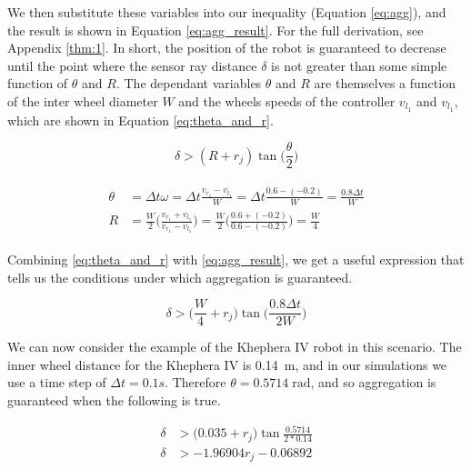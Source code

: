 \documentclass[conference]{IEEEtran}
\begin{document}
  We then substitute these variables into our inequality (Equation \ref{eq:agg}), and the result is shown in Equation \ref{eq:agg_result}. For the full derivation, see Appendix \ref{thm:1}. In short, the position of the robot is guaranteed to decrease until the point where the sensor ray distance $\delta$ is not greater than some simple function of $\theta$ and $R$. The dependant variables $\theta$ and $R$ are themselves a function of the inter wheel diameter $W$ and the wheels speeds of the controller $v_{l_1}$ and $v_{l_1}$, which are shown in Equation \ref{eq:theta_and_r}.

  \begin{equation} \label{eq:agg_result}
    \delta > (R + r_j)\tan\bigg(\frac{\theta}{2}\bigg)
  \end{equation}

  \begin{align}
    \begin{split} \label{eq:theta_and_r}
      \theta &= \Delta t\omega = \Delta t \frac{v_{r_1} - v_{l_1}}{W} = \Delta t \frac{0.6 - (-0.2)}{W} = \frac{0.8\Delta t}{W} \\
      R &= \frac{W}{2}\bigg(\frac{v_{r_1} + v_{l_1}}{v_{r_1} - v_{l_1}}\bigg) = \frac{W}{2}\bigg(\frac{0.6 + (-0.2)}{0.6 - (-0.2)}\bigg) = \frac{W}{4}
    \end{split}
  \end{align}

  Combining \ref{eq:theta_and_r} with \ref{eq:agg_result}, we get a useful expression that tells us the conditions under which aggregation is guaranteed.

  \begin{equation*} \label{eq:agg_final_result}
    \delta > \bigg(\frac{W}{4} + r_j\bigg)\tan\bigg(\frac{0.8\Delta t}{2W}\bigg)
  \end{equation*}

  We can now consider the example of the Khephera IV robot in this scenario. The inner wheel distance for the Khephera IV is \SI{0.14}{\meter}, and in our simulations we use a time step of $\Delta t = 0.1s$. Therefore $\theta = 0.5714\;\text{rad}$, and so aggregation is guaranteed when the following is true.

  \begin{equation} \label{eq:khephera_agg}
    \begin{split}
      \delta &> \bigg(0.035 + r_j\bigg)\tan\frac{0.5714}{2*0.14} \\
      \delta &> -1.96904 r_j - 0.06892
    \end{split}
  \end{equation}
\end{document}
